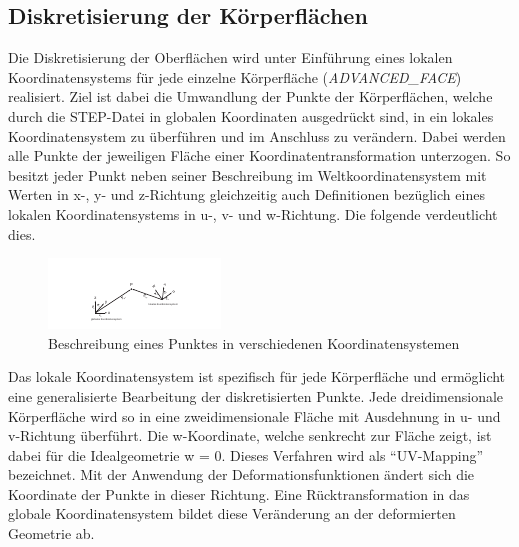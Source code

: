 \subsection{Diskretisierung der Körperflächen}

Die Diskretisierung der Oberflächen wird unter Einführung eines lokalen Koordinatensystems für jede einzelne Körperfläche (\textit{ADVANCED\_FACE}) realisiert.
Ziel ist dabei die Umwandlung der Punkte der Körperflächen, welche durch die STEP-Datei in globalen Koordinaten ausgedrückt sind, in ein lokales Koordinatensystem zu überführen und im Anschluss zu verändern. Dabei werden alle Punkte der jeweiligen Fläche einer Koordinatentransformation unterzogen. So besitzt jeder Punkt neben seiner Beschreibung im Weltkoordinatensystem mit Werten in x-, y- und z-Richtung gleichzeitig auch Definitionen bezüglich eines lokalen Koordinatensystems in u-, v- und w-Richtung. Die folgende  verdeutlicht dies. 

\begin{figure}[h]
	\centering
	
	\includegraphics[width=\linewidth]{img/basetrafo.pdf}
	
	\caption{Beschreibung eines Punktes in verschiedenen Koordinatensystemen}
	\label{fig:basetrafo}
	
\end{figure}

Das lokale Koordinatensystem ist spezifisch für jede Körperfläche und ermöglicht eine generalisierte Bearbeitung der diskretisierten Punkte. Jede dreidimensionale Körperfläche wird so in eine zweidimensionale Fläche mit Ausdehnung in u- und v-Richtung überführt. Die w-Koordinate, welche senkrecht zur Fläche zeigt, ist dabei für die Idealgeometrie w = 0. Dieses Verfahren wird als "`UV-Mapping"' bezeichnet. Mit der Anwendung der Deformationsfunktionen ändert sich die Koordinate der Punkte in dieser Richtung. Eine Rücktransformation in das globale Koordinatensystem bildet diese Veränderung an der deformierten Geometrie ab.       

